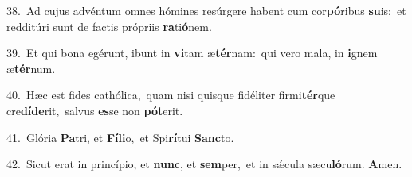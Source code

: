 {\numbfont\textcolor{\numbcolor}{38.}}~Ad cujus advéntum omnes hómines resúrgere habent cum cor\-\textbf{pó}\-ribus \textbf{su}\-is;~\star et redditúri sunt de factis própriis \textbf{ra}\-ti\-\textbf{ó}\-nem.\par
{\numbfont\textcolor{\numbcolor}{39.}}~Et qui bona egérunt, ibunt in \textbf{vi}\-tam æ\-\textbf{tér}\-nam:~\star qui vero mala, in \textbf{i}\-gnem æ\-\textbf{tér}\-num.\par
{\numbfont\textcolor{\numbcolor}{40.}}~Hæc est fides cathólica,~\dagger quam nisi quisque fidéliter firmi\-\textbf{tér}\-que cre\-\textbf{dí}\-\textbf{de}rit,~\star salvus \textbf{es}\-se non \textbf{pót}\-erit.\par
{\numbfont\textcolor{\numbcolor}{41.}}~Glória \textbf{Pa}\-tri, et \textbf{Fí}\-\textbf{li}o,~\star et Spi\-\textbf{rí}\-tui \textbf{Sanc}\-to.\par
{\numbfont\textcolor{\numbcolor}{42.}}~Sicut erat in princípio, et \textbf{nunc}\-, et \textbf{sem}\-per,~\star et in sǽcula sæcu\-\textbf{ló}\-rum. \textbf{A}\-men.\par
